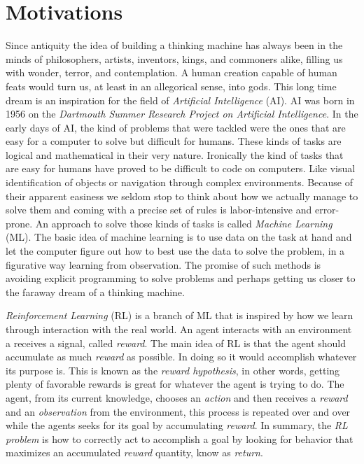 \documentclass[
  12pt,
  openany]{book}
\begin{document}
\hypertarget{motivations}{%
\section{Motivations}\label{motivations}}

Since antiquity the idea of building a thinking machine has always been in the minds of philosophers, artists, inventors, kings, and commoners alike, filling us with wonder, terror, and contemplation. A human creation capable of human feats would turn us, at least in an allegorical sense, into gods. This long time dream is an inspiration for the field of \emph{Artificial Intelligence} (AI). AI was born in 1956 on the \emph{Dartmouth Summer Research Project on Artificial Intelligence}. In the early days of AI, the kind of problems that were tackled were the ones that are easy for a computer to solve but difficult for humans. These kinds of tasks are logical and mathematical in their very nature. Ironically the kind of tasks that are easy for humans have proved to be difficult to code on computers. Like visual identification of objects or navigation through complex environments. Because of their apparent easiness we seldom stop to think about how we actually manage to solve them and coming with a precise set of rules is labor-intensive and error-prone. An approach to solve those kinds of tasks is called \emph{Machine Learning} (ML). The basic idea of machine learning is to use data on the task at hand and let the computer figure out how to best use the data to solve the problem, in a figurative way learning from observation. The promise of such methods is avoiding explicit programming to solve problems and perhaps getting us closer to the faraway dream of a thinking machine.

\emph{Reinforcement Learning} (RL) is a branch of ML that is inspired by how we learn through interaction with the real world. An agent interacts with an environment a receives a signal, called \emph{reward}. The main idea of RL is that the agent should accumulate as much \emph{reward} as possible. In doing so it would accomplish whatever its purpose is. This is known as the \emph{reward hypothesis}, in other words, getting plenty of favorable rewards is great for whatever the agent is trying to do. The agent, from its current knowledge, chooses an \emph{action} and then receives a \emph{reward} and an \emph{observation} from the environment, this process is repeated over and over while the agents seeks for its goal by accumulating \emph{reward}. In summary, the \emph{RL problem} is how to correctly act to accomplish a goal by looking for behavior that maximizes an accumulated \emph{reward} quantity, know as \emph{return}.
\end{document}
